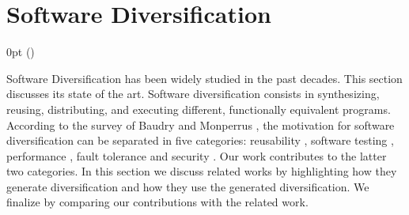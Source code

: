 \section{Software Diversification}
\label{sota:sota}
\def\checkmark{\tikz\fill[scale=0.4](0,.35) -- (.25,0) -- (1,.7) -- (.25,.15) -- cycle;} 

  {\topsep}%
  {\topsep}%
  {\itshape}%
  {0pt}%
  {\bfseries}%
  {}%
  { }%
  {()\textnormal{}}

\def\Gnospace~{G{}}
\theoremstyle{sota}
\newtheorem{goal}{G}
\providecommand*{\definitionautorefname}{\Gnospace}
\newcommand{\goalautorefname}{\Gnospace}


\def\Snospace~{S{}}
\theoremstyle{sota}
\newtheorem{strategy}{S}
\providecommand*{\definitionautorefname}{\Snospace}
\newcommand{\strategyautorefname}{\Snospace}

\def\Unospace~{U{}}
\theoremstyle{sota}
\newtheorem{usage}{U}
\providecommand*{\definitionautorefname}{\Unospace}
\newcommand{\usageautorefname}{\Unospace}









Software Diversification has been widely studied in the past decades. This section discusses its state of the art.
Software diversification consists in synthesizing, reusing, distributing, and executing different, functionally equivalent programs. 
According to the survey of Baudry and Monperrus \cite{natural_diversity}, the motivation for software diversification can be separated in five categories: reusability \cite{pohl2005software}, software testing \cite{Chen2010AdaptiveRT}, performance \cite{10.1145/2025113.2025133}, fault tolerance \cite{1659219} and security \cite{cohen1993operating}. Our work contributes to the latter two categories. In this section we discuss related works by highlighting how they generate diversification and how they use the generated diversification. We finalize by comparing our contributions with the related work.

